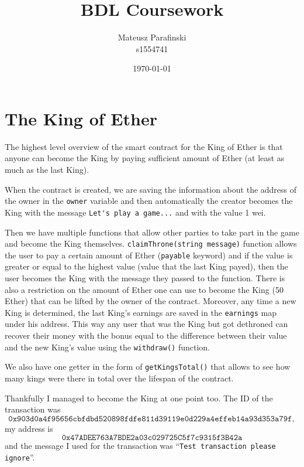 \documentclass{article}
\title{BDL Coursework}
\author{Mateusz Parafinski\\\small s1554741}
\date{\today}
\begin{document}
    \maketitle

    \section{The King of Ether}
    The highest level overview of the smart contract for the
    King of Ether is that anyone can become the King by
    paying sufficient amount of Ether (at least as much as
    the last King).
    \newline

    \noindent When the contract is created, we are saving
    the information about the address of the owner in the
    \verb|owner| variable and then automatically the creator
    becomes the King with the message \verb|Let's play a game...| 
    and with the value 1 wei.
    \newline

    \noindent Then we have multiple functions that allow
    other parties to take part in the game and become the
    King themselves. \verb|claimThrone(string message)|
    function allows the user to pay a certain amount of
    Ether (\verb|payable| keyword) and if the value is
    greater or equal to the highest value (value that the
    last King payed), then the user becomes the King with
    the message they passed to the function. There is also a
    restriction on the amount of Ether one can use to become
    the King (50 Ether) that can be lifted by the owner of
    the contract. Moreover, any time a new King is
    determined, the last King's earnings are saved in the
    \verb|earnings| map under his address. This way any user
    that was the King but got dethroned can recover their
    money with the bonus equal to the difference between
    their value and the new King's value using the
    \verb|withdraw()| function.
    \newline

    \noindent We also have one getter in the form of
    \verb|getKingsTotal()| that allows to see how many kings
    were there in total over the lifespan of the contract.
    \newline

    \noindent Thankfully I managed to become the King at one
    point too. The ID of the transaction was 
    \[
        \texttt{0x903d0a4f95656cbfdbd520898fdfe811d39119e0d229a4effeb14a93d353a79f},
    \]
    my address is
    \[
        \texttt{0x47ADEE763A7BDE2a03c029725C5f7c9315f3B42a}
    \]
    and the message I used for the transaction was
    ``\verb|Test transaction please ignore|''.
\end{document}
